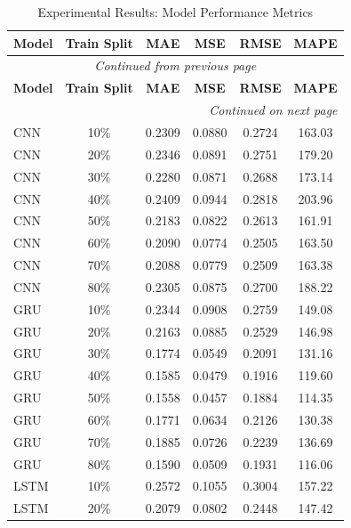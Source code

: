 
\begin{longtable}{l c c c c c}
    \toprule
    \textbf{Model} & \textbf{Train Split} & \textbf{MAE} & \textbf{MSE} & \textbf{RMSE} & \textbf{MAPE} \\
    \midrule
    \endfirsthead

    \multicolumn{6}{c}{{\textit{Continued from previous page}}} \\
    \toprule
    \textbf{Model} & \textbf{Train Split} & \textbf{MAE} & \textbf{MSE} & \textbf{RMSE} & \textbf{MAPE} \\
    \midrule
    \endhead

    \midrule \multicolumn{6}{r}{{\textit{Continued on next page}}} \\
    \endfoot

    \bottomrule
    \caption{Experimental Results: Model Performance Metrics}
    \label{tab:results_longtable}
    \endlastfoot
        CNN & 10\% & 0.2309 & 0.0880 & 0.2724 & 163.03 \\
        CNN & 20\% & 0.2346 & 0.0891 & 0.2751 & 179.20 \\
        CNN & 30\% & 0.2280 & 0.0871 & 0.2688 & 173.14 \\
        CNN & 40\% & 0.2409 & 0.0944 & 0.2818 & 203.96 \\
        CNN & 50\% & 0.2183 & 0.0822 & 0.2613 & 161.91 \\
        CNN & 60\% & 0.2090 & 0.0774 & 0.2505 & 163.50 \\
        CNN & 70\% & 0.2088 & 0.0779 & 0.2509 & 163.38 \\
        CNN & 80\% & 0.2305 & 0.0875 & 0.2700 & 188.22 \\
        GRU & 10\% & 0.2344 & 0.0908 & 0.2759 & 149.08 \\
        GRU & 20\% & 0.2163 & 0.0885 & 0.2529 & 146.98 \\
        GRU & 30\% & 0.1774 & 0.0549 & 0.2091 & 131.16 \\
        GRU & 40\% & 0.1585 & 0.0479 & 0.1916 & 119.60 \\
        GRU & 50\% & 0.1558 & 0.0457 & 0.1884 & 114.35 \\
        GRU & 60\% & 0.1771 & 0.0634 & 0.2126 & 130.38 \\
        GRU & 70\% & 0.1885 & 0.0726 & 0.2239 & 136.69 \\
        GRU & 80\% & 0.1590 & 0.0509 & 0.1931 & 116.06 \\
        LSTM & 10\% & 0.2572 & 0.1055 & 0.3004 & 157.22 \\
        LSTM & 20\% & 0.2079 & 0.0802 & 0.2448 & 147.42 \\

\end{longtable}

